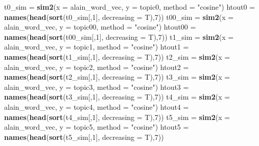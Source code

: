 \documentclass[
]{article}
\newenvironment{Shaded}{\begin{snugshade}}{\end{snugshade}}
\newcommand{\AttributeTok}[1]{\textcolor[rgb]{0.13,0.29,0.53}{#1}}
\newcommand{\DecValTok}[1]{\textcolor[rgb]{0.00,0.00,0.81}{#1}}
\newcommand{\FunctionTok}[1]{\textcolor[rgb]{0.13,0.29,0.53}{\textbf{#1}}}
\newcommand{\NormalTok}[1]{#1}
\newcommand{\OtherTok}[1]{\textcolor[rgb]{0.56,0.35,0.01}{#1}}
\newcommand{\StringTok}[1]{\textcolor[rgb]{0.31,0.60,0.02}{#1}}
\begin{document}
\begin{Shaded}
\begin{Highlighting}[]
\NormalTok{t0\_sim }\OtherTok{=} \FunctionTok{sim2}\NormalTok{(}\AttributeTok{x =}\NormalTok{ alain\_word\_vec, }\AttributeTok{y =}\NormalTok{ topic0, }\AttributeTok{method =} \StringTok{"cosine"}\NormalTok{)}
\NormalTok{htout0 }\OtherTok{=} \FunctionTok{names}\NormalTok{(}\FunctionTok{head}\NormalTok{(}\FunctionTok{sort}\NormalTok{(t0\_sim[,}\DecValTok{1}\NormalTok{], }\AttributeTok{decreasing =}\NormalTok{ T),}\DecValTok{7}\NormalTok{))}
\NormalTok{t00\_sim }\OtherTok{=} \FunctionTok{sim2}\NormalTok{(}\AttributeTok{x =}\NormalTok{ alain\_word\_vec, }\AttributeTok{y =}\NormalTok{ topic00, }\AttributeTok{method =} \StringTok{"cosine"}\NormalTok{)}
\NormalTok{htout00 }\OtherTok{=} \FunctionTok{names}\NormalTok{(}\FunctionTok{head}\NormalTok{(}\FunctionTok{sort}\NormalTok{(t00\_sim[,}\DecValTok{1}\NormalTok{], }\AttributeTok{decreasing =}\NormalTok{ T),}\DecValTok{7}\NormalTok{))}
\NormalTok{t1\_sim }\OtherTok{=} \FunctionTok{sim2}\NormalTok{(}\AttributeTok{x =}\NormalTok{ alain\_word\_vec, }\AttributeTok{y =}\NormalTok{ topic1, }\AttributeTok{method =} \StringTok{"cosine"}\NormalTok{)}
\NormalTok{htout1 }\OtherTok{=} \FunctionTok{names}\NormalTok{(}\FunctionTok{head}\NormalTok{(}\FunctionTok{sort}\NormalTok{(t1\_sim[,}\DecValTok{1}\NormalTok{], }\AttributeTok{decreasing =}\NormalTok{ T),}\DecValTok{7}\NormalTok{))}
\NormalTok{t2\_sim }\OtherTok{=} \FunctionTok{sim2}\NormalTok{(}\AttributeTok{x =}\NormalTok{ alain\_word\_vec, }\AttributeTok{y =}\NormalTok{ topic2, }\AttributeTok{method =} \StringTok{"cosine"}\NormalTok{)}
\NormalTok{htout2 }\OtherTok{=} \FunctionTok{names}\NormalTok{(}\FunctionTok{head}\NormalTok{(}\FunctionTok{sort}\NormalTok{(t2\_sim[,}\DecValTok{1}\NormalTok{], }\AttributeTok{decreasing =}\NormalTok{ T),}\DecValTok{7}\NormalTok{))}
\NormalTok{t3\_sim }\OtherTok{=} \FunctionTok{sim2}\NormalTok{(}\AttributeTok{x =}\NormalTok{ alain\_word\_vec, }\AttributeTok{y =}\NormalTok{ topic3, }\AttributeTok{method =} \StringTok{"cosine"}\NormalTok{)}
\NormalTok{htout3 }\OtherTok{=} \FunctionTok{names}\NormalTok{(}\FunctionTok{head}\NormalTok{(}\FunctionTok{sort}\NormalTok{(t3\_sim[,}\DecValTok{1}\NormalTok{], }\AttributeTok{decreasing =}\NormalTok{ T),}\DecValTok{7}\NormalTok{))}
\NormalTok{t4\_sim }\OtherTok{=} \FunctionTok{sim2}\NormalTok{(}\AttributeTok{x =}\NormalTok{ alain\_word\_vec, }\AttributeTok{y =}\NormalTok{ topic4, }\AttributeTok{method =} \StringTok{"cosine"}\NormalTok{)}
\NormalTok{htout4 }\OtherTok{=} \FunctionTok{names}\NormalTok{(}\FunctionTok{head}\NormalTok{(}\FunctionTok{sort}\NormalTok{(t4\_sim[,}\DecValTok{1}\NormalTok{], }\AttributeTok{decreasing =}\NormalTok{ T),}\DecValTok{7}\NormalTok{))}
\NormalTok{t5\_sim }\OtherTok{=} \FunctionTok{sim2}\NormalTok{(}\AttributeTok{x =}\NormalTok{ alain\_word\_vec, }\AttributeTok{y =}\NormalTok{ topic5, }\AttributeTok{method =} \StringTok{"cosine"}\NormalTok{)}
\NormalTok{htout5 }\OtherTok{=} \FunctionTok{names}\NormalTok{(}\FunctionTok{head}\NormalTok{(}\FunctionTok{sort}\NormalTok{(t5\_sim[,}\DecValTok{1}\NormalTok{], }\AttributeTok{decreasing =}\NormalTok{ T),}\DecValTok{7}\NormalTok{))}


\end{Highlighting}
\end{Shaded}
\end{document}
